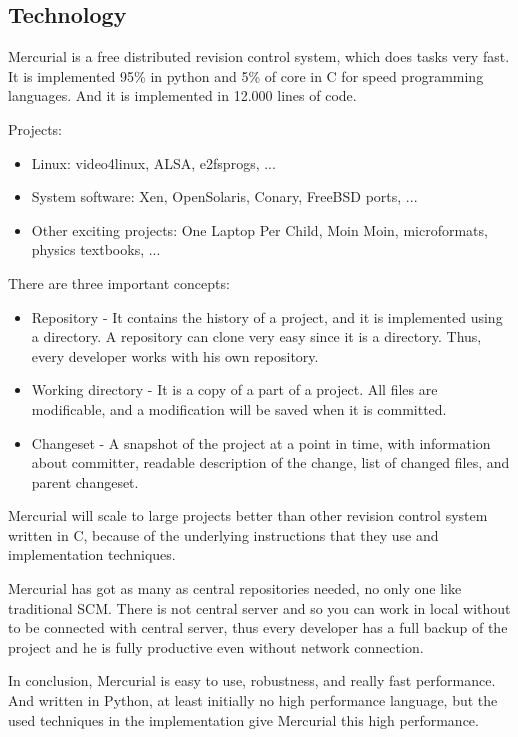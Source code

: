 \documentclass[11pt]{article}
\begin{document}
\subsection{Technology}
Mercurial is a free distributed revision control system, which does tasks very fast. It is implemented 95\% in python and 5\% of core in C for speed programming languages. And it is implemented in 12.000 lines of code.

Projects:
\begin{itemize}
	\item Linux: video4linux, ALSA, e2fsprogs, ...
	\item System software: Xen, OpenSolaris, Conary, FreeBSD ports, ...
	\item Other exciting projects: One Laptop Per Child, Moin Moin, microformats, physics textbooks, ...
\end{itemize}

There are three important concepts:
\begin{itemize}
	\item Repository - It contains the history of a project, and it is implemented using a directory. A repository can clone very easy since it is a directory. Thus, every developer works with his own repository.
	\item Working directory - It is a copy of a part of a project. All files are modificable, and a modification will be saved when it is committed.
	\item Changeset - A snapshot of the project at a point in time, with information about committer, readable description of the change, list of changed files, and parent changeset.
\end{itemize}

Mercurial will scale to large projects better than other revision control system written in C, because of the underlying instructions that they use and implementation techniques.

Mercurial has got as many as central repositories needed, no only one like traditional SCM. There is not central server and so you can work in local without to be connected with central server, thus every developer has a full backup of the project and he is fully productive even without network connection.

In conclusion, Mercurial is easy to use, robustness, and really fast performance. And written in Python, at least initially no high performance language, but the used techniques in the implementation give Mercurial this high performance. 
\end{document}

